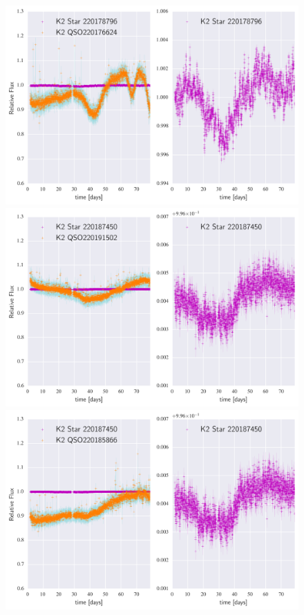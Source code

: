 \documentclass[a4paper,fleqn,usenatbib]{mnras}
\begin{document}
          \begin{figure}
 	\includegraphics[width=\columnwidth]{220176624NearestNeighbor.png}
 	\includegraphics[width=\columnwidth]{220191502NearestNeighbor.png}
 	\includegraphics[width=\columnwidth]{220185866NearestNeighbor.png}
          	\caption{}
          	\label{fig:example_figure}
          \end{figure}          
          
\end{document}
